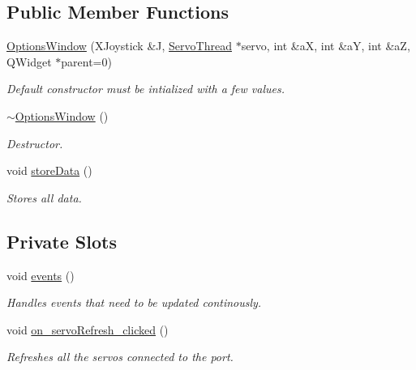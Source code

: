 \subsection*{Public Member Functions}
\begin{DoxyCompactItemize}
\item 
\hyperlink{a00006_a968da93eec85561ebdb3a464eff15611}{Options\+Window} (X\+Joystick \&J, \hyperlink{a00008}{Servo\+Thread} $\ast$servo, int \&a\+X, int \&a\+Y, int \&a\+Z, Q\+Widget $\ast$parent=0)
\begin{DoxyCompactList}\small\item\em Default constructor must be intialized with a few values. \end{DoxyCompactList}\item 
\hyperlink{a00006_a034c885fe8bb4416e732a9571d14a6b4}{$\sim$\+Options\+Window} ()
\begin{DoxyCompactList}\small\item\em Destructor. \end{DoxyCompactList}\item 
void \hyperlink{a00006_ab0a56ad7347c20046602a7a2a1c83397}{store\+Data} ()
\begin{DoxyCompactList}\small\item\em Stores all data. \end{DoxyCompactList}\end{DoxyCompactItemize}
\subsection*{Private Slots}
\begin{DoxyCompactItemize}
\item 
void \hyperlink{a00006_a18763ff318688083c7ee5a21f22e8e98}{events} ()
\begin{DoxyCompactList}\small\item\em Handles events that need to be updated continously. \end{DoxyCompactList}\item 
void \hyperlink{a00006_ad5365d452e8bcd86cbb64b9ec42c3b7e}{on\+\_\+servo\+Refresh\+\_\+clicked} ()
\begin{DoxyCompactList}\small\item\em Refreshes all the servos connected to the port. \end{DoxyCompactList}\end{DoxyCompactItemize}
